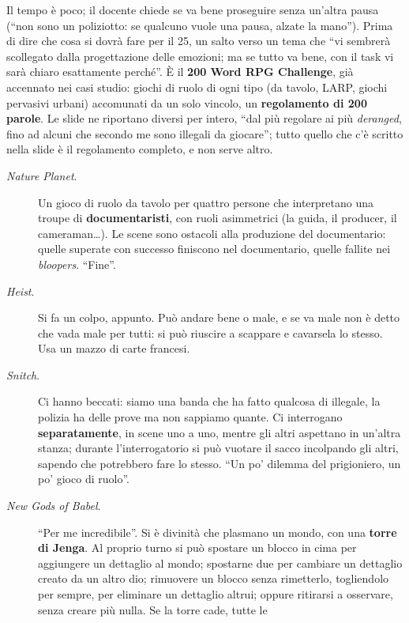 Il tempo è poco; il docente chiede se va bene proseguire senza un'altra pausa (``non
sono un poliziotto: se qualcuno vuole una pausa, alzate la mano''). Prima di dire che
cosa si dovrà fare per il 25, un salto verso un tema che ``vi sembrerà scollegato
dalla progettazione delle emozioni; ma se tutto va bene, con il task vi sarà chiaro
esattamente perché''. È il \textbf{200 Word RPG Challenge}, già accennato nei casi
studio: giochi di ruolo di ogni tipo (da tavolo, LARP, giochi pervasivi urbani)
accomunati da un solo vincolo, un \textbf{regolamento di 200 parole}. Le slide ne
riportano diversi per intero, ``dal più regolare ai più \emph{deranged}, fino ad alcuni
che secondo me sono illegali da giocare''; tutto quello che c'è scritto nella slide è
il regolamento completo, e non serve altro.

\begin{description}
  \item[\emph{Nature Planet}.] Un gioco di ruolo da tavolo per quattro persone che
        interpretano una troupe di \textbf{documentaristi}, con ruoli asimmetrici
        (la guida, il producer, il cameraman\ldots). Le scene sono ostacoli alla
        produzione del documentario: quelle superate con successo finiscono nel
        documentario, quelle fallite nei \emph{bloopers}. ``Fine''.
  \item[\emph{Heist}.] Si fa un colpo, appunto. Può andare bene o male, e se va
        male non è detto che vada male per tutti: si può riuscire a scappare e
        cavarsela lo stesso. Usa un mazzo di carte francesi.
  \item[\emph{Snitch}.] Ci hanno beccati: siamo una banda che ha fatto qualcosa di
        illegale, la polizia ha delle prove ma non sappiamo quante. Ci interrogano
        \textbf{separatamente}, in scene uno a uno, mentre gli altri aspettano in
        un'altra stanza; durante l'interrogatorio si può vuotare il sacco incolpando
        gli altri, sapendo che potrebbero fare lo stesso. ``Un po' dilemma del
        prigioniero, un po' gioco di ruolo''.
  \item[\emph{New Gods of Babel}.] ``Per me incredibile''. Si è divinità che
        plasmano un mondo, con una \textbf{torre di Jenga}. Al proprio turno si può
        spostare un blocco in cima per aggiungere un dettaglio al mondo; spostarne due
        per cambiare un dettaglio creato da un altro dio; rimuovere un blocco senza
        rimetterlo, togliendolo per sempre, per eliminare un dettaglio altrui; oppure
        ritirarsi a osservare, senza creare più nulla. Se la torre cade, tutte le

\end{description}
